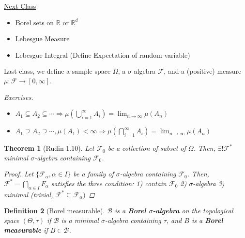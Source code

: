 \documentclass[12pt]{report}
\renewcommand{\1}{\mathbb{1}}
\renewcommand{\subset}{\subseteq}
\renewcommand{\supset}{\supseteq}
\theoremstyle{break}
\newtheorem{thm}{Theorem}[section] %
\theoremstyle{newdef}
\newtheorem{defn}[thm]{Definition} %
\theoremstyle{remark}
\begin{document}
\underline{Next Class}
\begin{itemize}
\item Borel sets on $\mathbb{R}$ or $\mathbb{R}^d$
\item Lebesgue Measure
\item Lebesgue Integral (Define Expectation of random variable)
\end{itemize}

\vspace{5mm}

Last class, we define a sample space $\Omega$, a $\sigma$-algebra $\mathcal{F}$, and a (positive) measure $\mu : \mathcal{F} \rightarrow [0,\infty]$.
\vspace{5mm}

\textit{Exercises.}
\begin{itemize}
\item $A_1 \subset A_2 \subset \cdots \Rightarrow \mu(\bigcup_{i=1}^\infty A_i) = \lim_{n\rightarrow\infty}\mu(A_n)$
\item $A_1 \supset A_2 \supset \cdots, \mu(A_1) < \infty \Rightarrow \mu(\bigcap_{i=1}^\infty A_i) = \lim_{n\rightarrow\infty}\mu(A_n)$
\end{itemize}

\begin{thm}[Rudin 1.10]
Let $\mathcal{F}_0$ be a collection of subset of $\Omega$.
Then, $\exists! \mathcal{F}^*$ minimal $\sigma$-algebra containing $\mathcal F_0$.

\begin{proof}
Let $\{\mathcal{F}_\alpha, \alpha \in I\}$ be a family of $\sigma$-algebra containing $\mathcal{F}_0$.
Then, $\mathcal{F}^* = \bigcap_{\alpha\in I} F_\alpha$ satisfies the three condition:
1) contain $\mathcal{F}_0$
2) $\sigma$-algebra
3) minimal (trivial, $\mathcal{F}^* \subset \mathcal{F}_\alpha)$
\end{proof}
\end{thm}


\begin{defn}[Borel measurable]
$\mathcal{B}$ is a \textbf{Borel $\sigma$-algebra} on the topological space $(\Theta,\tau)$ if
$\mathcal{B}$ is a minimal $\sigma$-algebra containing $\tau$, and $B$ is a \textbf{Borel measurable} if $B \in \mathcal{B}$.
\end{defn}
\end{document}
